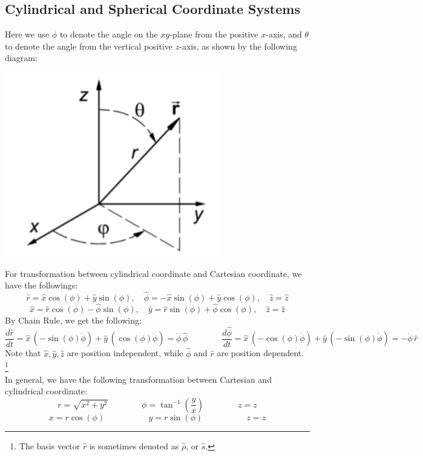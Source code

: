 \documentclass[11pt,oneside]{book}
\theoremstyle{break}
\theoremstyle{break}
\begin{document}
\subsection*{Cylindrical and Spherical Coordinate Systems}
Here we use $\phi$ to denote the angle on the $xy$-plane from the positive $x$-axis, and $\theta$ to denote the angle from the vertical positive $z$-axis, as shown by the following diagram:\\
\begin{center}
\includegraphics[scale=0.5]{thetaAndPhi.png}
\end{center}


For transformation between cylindrical coordinate and Cartesian coordinate, we have the followings:
$$\hat{r} = \hat{x}\cos(\phi) + \hat{y}\sin(\phi),\quad \hat{\phi} = -\hat{x}\sin(\phi) + \hat{y}\cos(\phi),\quad \hat{z}=\hat{z}$$
$$\hat{x} = \hat{r}\cos(\phi) - \hat{\phi}\sin(\phi),\quad \hat{y}=\hat{r}\sin(\phi) + \hat{\phi}\cos(\phi),\quad \hat{z} = \hat{z}$$
By Chain Rule, we get the following:
$$\frac{d\hat{r}}{dt} = \hat{x}\,(-\sin(\phi)\dot{\phi}) + \hat{y}\,(\cos(\phi)\dot{\phi}) = \dot{\phi}\,\hat{\phi} \qquad\qquad\frac{d\hat{\phi}}{dt} = \hat{x}\,(-\cos(\phi)\dot{\phi})+ \hat{y}\,(-\sin(\phi) \dot{\phi}) = -\dot{\phi}\,\hat{r}$$
Note that $\hat{x},\hat{y},\hat{z}$ are position independent, while $\hat{\phi}$ and $\hat{r}$  are position dependent. \footnote{The basis vector $\hat{r}$ is sometimes denoted as $\hat{\rho}$, or $\hat{s}$.}\\

In general, we have the following transformation between Cartesian and cylindrical coordinate:
$$r = \sqrt{x^2 + y^2} \qquad \qquad \phi = \tan^{-1}\left(\frac{y}{x} \right)\qquad\qquad z=z$$
$$x = r \cos(\phi) \qquad\quad\, \qquad y=r \sin(\phi) \qquad\qquad\quad\,  z=z$$
\end{document}
